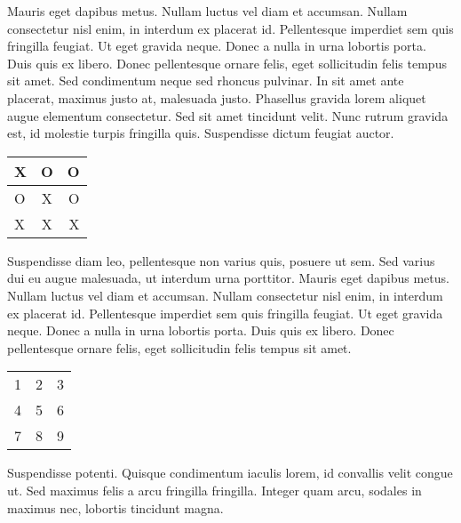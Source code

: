 \documentclass{article}
\begin{document}
\begin{multicols}{2}
Mauris eget dapibus metus. Nullam luctus vel diam et accumsan. Nullam consectetur nisl enim, in interdum ex placerat id. Pellentesque imperdiet sem quis fringilla feugiat. Ut eget gravida neque. Donec a nulla in urna lobortis porta. Duis quis ex libero. Donec pellentesque ornare felis, eget sollicitudin felis tempus sit amet.
Sed condimentum neque sed rhoncus pulvinar. In sit amet ante placerat, maximus justo at, malesuada justo. Phasellus gravida lorem aliquet augue elementum consectetur. Sed sit amet tincidunt velit. Nunc rutrum gravida est, id molestie turpis fringilla quis. Suspendisse dictum feugiat auctor.


\begin{center}
  \begin{tabular}{ | l | c  r | }
    \hline
    X & O & O \\ \hline
    O & X & O \\ \hline
    X & X & X \\
    \hline
  \end{tabular}
\end{center}

Suspendisse diam leo, pellentesque non varius quis, posuere ut sem. Sed varius dui eu augue malesuada, ut interdum urna porttitor. 
Mauris eget dapibus metus. Nullam luctus vel diam et accumsan. Nullam consectetur nisl enim, in interdum ex placerat id. Pellentesque imperdiet sem quis fringilla feugiat. Ut eget gravida neque. Donec a nulla in urna lobortis porta. Duis quis ex libero. Donec pellentesque ornare felis, eget sollicitudin felis tempus sit amet.

\begin{center}
\begin{tabular}{ c c c }
 1 & 2 & 3 \\ 
 4 & 5 & 6 \\  
 7 & 8 & 9    
\end{tabular}
\end{center}


Suspendisse potenti. Quisque condimentum iaculis lorem, id convallis velit congue ut. Sed maximus felis a arcu fringilla fringilla. Integer quam arcu, sodales in maximus nec, lobortis tincidunt magna. 


\end{multicols}
\end{document}
